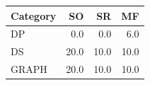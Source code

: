 \begin{tabular}{@{}lrrr@{}}
\toprule
Category & SO & SR & MF \\
\midrule
DP & 0.0 & 0.0 & 6.0 \\
DS & 20.0 & 10.0 & 10.0 \\
GRAPH & 20.0 & 10.0 & 10.0 \\
\bottomrule
\end{tabular}
